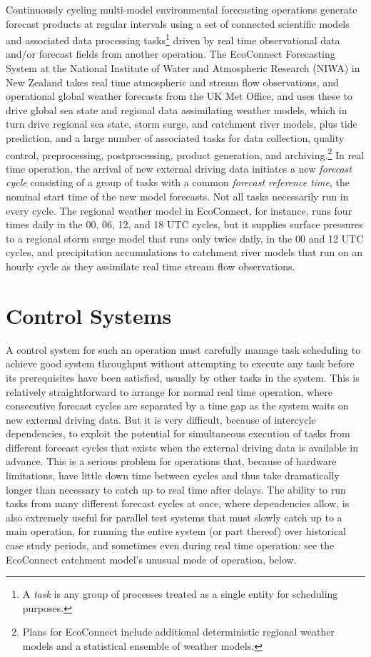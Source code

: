 \documentclass[11pt,a4paper]{article}
\begin{document}
Continuously cycling multi-model environmental forecasting operations
generate forecast products at regular intervals using a set of connected
scientific models and associated data processing tasks\footnote{A {\em
task} is any group of processes treated as a single entity for
scheduling purposes.} driven by real time observational data and/or forecast
fields from another operation.  The EcoConnect Forecasting System at the
National Institute of Water and Atmospheric Research (NIWA) in New
Zealand takes real time atmospheric and stream flow observations, and
operational global weather forecasts from the UK Met Office, and uses
these to drive global sea state and regional data assimilating weather
models, which in turn drive regional sea state, storm surge, and
catchment river models, plus tide prediction, and a large number of
associated tasks for data collection, quality control, preprocessing,
postprocessing, product generation, and archiving.\footnote{Plans for
EcoConnect include additional deterministic regional weather models and
a statistical ensemble of weather models.}  In real time operation, the
arrival of new external driving data initiates a new {\em forecast
cycle} consisting of a group of tasks with a common {\em forecast
reference time}, the nominal start time of the new model forecasts. Not
all tasks necessarily run in every cycle. The regional weather model in
EcoConnect, for instance, runs four times daily in the 00, 06, 12, and
18 UTC cycles, but it supplies surface pressures to a regional storm
surge model that runs only twice daily, in the 00 and 12 UTC cycles, and
precipitation accumulations to catchment river models that run on an
hourly cycle as they assimilate real time stream flow observations. 

\section{Control Systems}

A control system for such an operation must carefully manage task
scheduling to achieve good system throughput without attempting to
execute any task before its prerequisites have been satisfied, usually
by other tasks in the system. This is relatively straightforward to
arrange for normal real time operation, where consecutive forecast
cycles are separated by a time gap as the system waits on new external
driving data. But it is very difficult, because of intercycle
dependencies, to exploit the potential for simultaneous execution of
tasks from different forecast cycles that exists when the external
driving data is available in advance. This is a serious problem for
operations that, because of hardware limitations, have little down time
between cycles and thus take dramatically longer than necessary to catch
up to real time after delays. The ability to run tasks from many
different forecast cycles at once, where dependencies allow, is also
extremely useful for parallel test systems that must slowly catch up to
a main operation, for running the entire system (or part thereof) over
historical case study periods, and sometimes even during real time
operation: see the EcoConnect catchment model's unusual mode of
operation, below.
\end{document}
